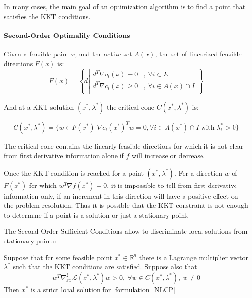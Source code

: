In many cases, the main goal of an optimization algorithm is to find a point that satisfies the KKT conditions.

\paragraph{Second-Order Optimality Conditions}

\begin{definition}
  Given a feasible point $x$, and the active set $\mathit{A}(x)$, the  set of linearized feasible directions $F(x)$ is:
  \begin{equation}
    F(x)=\left\{d\left|
        \begin{array}{ll}
          d^T\nabla c_i(x) = 0&,\ \forall i\in E \\
          d^T\nabla c_i(x) \geq 0&,\ \forall i\in \mathit{A}(x)\cap I \\
        \end{array}
        \right.
    \right\}
  \end{equation}
\end{definition}

And at a KKT solution $(x^*,\lambda^*)$ the critical cone $C(x^*, \lambda^*)$ is:

\begin{equation}
  C(x^*,\lambda^*) = \{w\in F(x^*)|\nabla c_i(x^*)^Tw=0, \forall i\in\mathit{A}(x^*)\cap I \text{ with } \lambda_i^*>0\}
\end{equation}

The critical cone contains the linearly feasible directions for which it is not clear from first derivative information alone if $f$ will increase or decrease.

Once the KKT condition is reached for a point $(x^*, \lambda^*)$.
For a direction $w$ of $F(x^*)$ for which $w^T\nabla f(x^*)=0$, it is impossible to tell from first derivative information only, if an increment in this direction will have a positive effect on the problem resolution.
Thus it is possible that the KKT constraint is not enough to determine if a point is a solution or just a stationary point.

The Second-Order Sufficient Conditions allow to discriminate local solutions from stationary points:

\begin{theorem}
  Suppose that for some feasible point $x^*\in \mathbb{R}^n$ there is a Lagrange multiplier vector $\lambda^*$ such that the KKT conditions are satisfied. Suppose also that
  \begin{equation}
    w^T\nabla_{xx}^2\mathcal{L}(x^*,\lambda^*)w>0,\ \forall w\in C(x^*,\lambda^*),\ w\neq 0
  \end{equation}
  Then $x^*$ is a strict local solution for \ref{formulation_NLCP}
\end{theorem}

